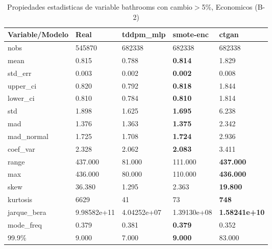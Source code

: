 \begin{table}[H]
\centering
\fontsize{8}{14}\selectfont
\caption{Propiedades estadisticas de variable bathrooms con cambio\ensuremath{>}5\%, Economicos (B-2)}
\label{table-stats-economicos-b-2-bathrooms-short}
\begin{tabular}{|l|m{10em}|m{10em}|m{10em}|m{10em}|}
\hline
 \rowcolor[gray]{0.8}
Variable/Modelo & Real & tddpm\_mlp & smote-enc & ctgan \\
\hline nobs & 545870 & 682338 & 682338 & 682338 \\
\hline mean & 0.815 & 0.788 & \bfseries 0.814 & \cellcolor[rgb]{0.9, 0.54, 0.52} 1.829 \\
\hline std\_err & 0.003 & 0.002 & \bfseries 0.002 & \cellcolor[rgb]{0.9, 0.54, 0.52} 0.008 \\
\hline upper\_ci & 0.820 & 0.792 & \bfseries 0.818 & \cellcolor[rgb]{0.9, 0.54, 0.52} 1.844 \\
\hline lower\_ci & 0.810 & 0.784 & \bfseries 0.810 & \cellcolor[rgb]{0.9, 0.54, 0.52} 1.814 \\
\hline std & 1.898 & 1.625 & \bfseries 1.695 & \cellcolor[rgb]{0.9, 0.54, 0.52} 6.238 \\
\hline mad & 1.376 & 1.363 & \bfseries 1.375 & \cellcolor[rgb]{0.9, 0.54, 0.52} 2.342 \\
\hline mad\_normal & 1.725 & 1.708 & \bfseries 1.724 & \cellcolor[rgb]{0.9, 0.54, 0.52} 2.936 \\
\hline coef\_var & 2.328 & 2.062 & \bfseries 2.083 & \cellcolor[rgb]{0.9, 0.54, 0.52} 3.411 \\
\hline range & 437.000 & \cellcolor[rgb]{0.9, 0.54, 0.52} 81.000 & 111.000 & \bfseries 437.000 \\
\hline max & 436.000 & \cellcolor[rgb]{0.9, 0.54, 0.52} 80.000 & 110.000 & \bfseries 436.000 \\
\hline skew & 36.380 & \cellcolor[rgb]{0.9, 0.54, 0.52} 1.295 & 2.363 & \bfseries 19.800 \\
\hline kurtosis & 6629 & \cellcolor[rgb]{0.9, 0.54, 0.52} 41 & 73 & \bfseries 748 \\
\hline jarque\_bera & 9.98582e+11 & \cellcolor[rgb]{0.9, 0.54, 0.52} 4.04252e+07 & 1.39130e+08 & \bfseries 1.58241e+10 \\
\hline mode\_freq & 0.379 & 0.381 & \bfseries 0.379 & \cellcolor[rgb]{0.9, 0.54, 0.52} 0.352 \\
\hline 99.9\% & 9.000 & 7.000 & \bfseries 9.000 & \cellcolor[rgb]{0.9, 0.54, 0.52} 83.000 \\
\hline
\end{tabular}
\end{table}

